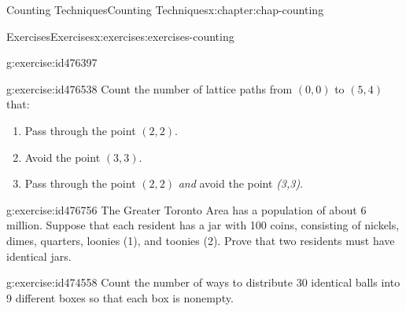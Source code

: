 \documentclass[oneside,10pt,]{book}
\numberwithin{equation}{section}
\begin{document}
\begin{chapterptx}{Counting Techniques}{}{Counting Techniques}{}{}{x:chapter:chap-counting}
\begin{exercises-section}{Exercises}{}{Exercises}{}{}{x:exercises:exercises-counting}
\begin{divisionexercise}{14}{}{}{g:exercise:id476397}
\begin{sidebyside}{3}{0.0916666666666667}{0.0916666666666667}{0.183333333333333}
\begin{sbspanel}{0.15}
{
}%
\end{sbspanel}%
\begin{sbspanel}{0.15}%
%
\end{sbspanel}%
\end{sidebyside}%
\end{divisionexercise}%
\begin{divisionexercise}{15}{}{}{g:exercise:id476538}%
Count the number of lattice paths from \((0,0)\) to \((5,4)\) that:%
\begin{enumerate}[label=(\alph*)]
\item{}Pass through the point \((2,2)\).%
\item{}Avoid the point \((3,3)\).%
\item{}Pass through the point \((2,2)\) \emph{and} avoid the point \emph{(3,3)}.%
\end{enumerate}
%
\begin{sidebyside}{1}{0.3}{0.3}{0}%
\begin{sbspanel}{0.4}%
%
\end{sbspanel}%
\end{sidebyside}%
\end{divisionexercise}%
\begin{divisionexercise}{16}{}{}{g:exercise:id476756}%
The Greater Toronto Area has a population of about 6 million. Suppose that each resident has a jar with 100 coins, consisting of nickels, dimes, quarters, loonies (\textdollar{}1), and toonies (\textdollar{}2). Prove that two residents must have identical jars.%
\end{divisionexercise}%
\begin{divisionexercise}{17}{}{}{g:exercise:id474558}%
Count the number of ways to distribute 30 identical balls into 9 different boxes so that each box is nonempty.%

\end{divisionexercise}
\end{exercises-section}
\end{chapterptx}
\end{document}
